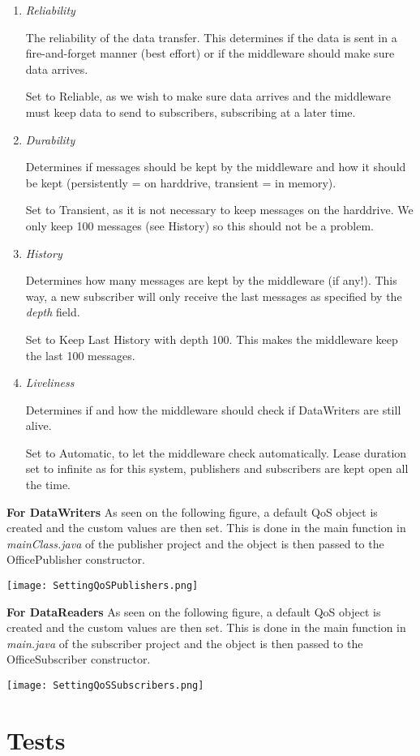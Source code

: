 \begin{enumerate}
\item \textit{Reliability}

The reliability of the data transfer. This determines if the data is sent in a fire-and-forget manner (best effort) or if the middleware should make sure data arrives.

Set to Reliable, as we wish to make sure data arrives and the middleware must keep data to send to subscribers, subscribing at a later time.

\item \textit{Durability}

Determines if messages should be kept by the middleware and how it should be kept (persistently = on harddrive, transient = in memory).

Set to Transient, as it is not necessary to keep messages on the harddrive. We only keep 100 messages (see History) so this should not be a problem.

\item \textit{History}

Determines how many messages are kept by the middleware (if any!). This way, a new subscriber will only receive the last messages as specified by the \textit{depth} field.

Set to Keep Last History with depth 100. This makes the middleware keep the last 100 messages. 

\item \textit{Liveliness}

Determines if and how the middleware should check if DataWriters are still alive. 

Set to Automatic, to let the middleware check automatically. Lease duration set to infinite as for this system, publishers and subscribers are kept open all the time.

\end{enumerate}

\textbf{For DataWriters}
As seen on the following figure, a default QoS object is created and the custom values are then set. This is done in the main function in \textit{mainClass.java} of the publisher project and the object is then passed to the OfficePublisher constructor.
\begin{center}
	\texttt{[image: SettingQoSPublishers.png]}
\end{center}

\textbf{For DataReaders}
As seen on the following figure, a default QoS object is created and the custom values are then set. This is done in the main function in \textit{main.java} of the subscriber project and the object is then passed to the OfficeSubscriber constructor.
\begin{center}
	\texttt{[image: SettingQoSSubscribers.png]}
\end{center}

\section{Tests}
